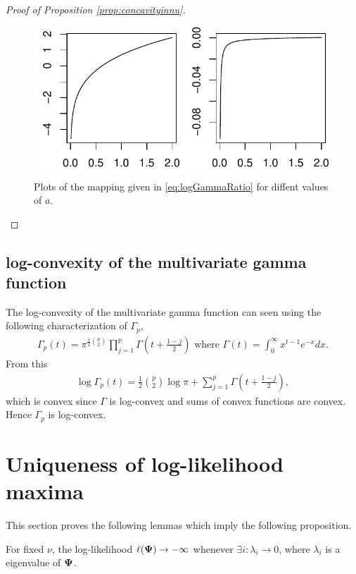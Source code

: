 \documentclass{article}\usepackage[]{graphicx}\usepackage[]{color}
\makeatletter
\def\maxwidth{ %
  \ifdim\Gin@nat@width>\linewidth
    \linewidth
  \else
    \Gin@nat@width
  \fi
}
\newenvironment{knitrout}{}{} %
\makeatother
\begin{document}
\begin{proof}[Proof of Proposition \ref{prop:concavityinnu}]
\begin{knitrout}
\begin{figure}[ht]
\includegraphics[width=\maxwidth]{figure/log_gamma_ratio} \caption[]{Plots of the mapping given in \eqref{eq:logGammaRatio} for diffent values of $a$.\label{fig:log_gamma_ratio}}
\end{figure}


\end{knitrout}
\end{proof}


\subsection{log-convexity of the multivariate gamma function}
\label{sec:multigamma}
The log-convexity of the multivariate gamma function can seen using the following characterization of $\Gamma_p$,
\begin{align}
  \label{eq:multigamma}
  \Gamma_p(t) = \pi^{ \frac{1}{2} \binom{p}{2} }
  \prod_{j = 1}^p \Gamma\!\left(t + \frac{1 - j}{2}\right)
  \text{ where }
  \Gamma(t) = \int_0^\infty x^{t-1} e^{-x} dx.
\end{align}
From this
\begin{align}
  \label{eq:logmultigamma}
  \log\Gamma_p(t) =
  \frac{1}{2}\binom{p}{2} \log\pi +
  \sum_{j = 1}^p \Gamma\left(t + \frac{1-j}{2}\right),
\end{align}
which is convex since $\Gamma$ is log-convex and sums of convex functions are convex.
Hence $\Gamma_p$ is log-convex.





\section{Uniqueness of log-likelihood maxima}
\label{sec:negativedefinite}
This section proves the following lemmas which imply the following proposition.

\begin{lemma}
\label{lem:elltominusinfty}
For fixed $\nu$, the log-likelihood $\ell({\boldsymbol{\Psi}}) \to -\infty$ whenever $\exists i : \lambda_i \to 0$, where $\lambda_i$ is a eigenvalue of ${\boldsymbol{\Psi}}$.
\end{lemma}
\end{document}
